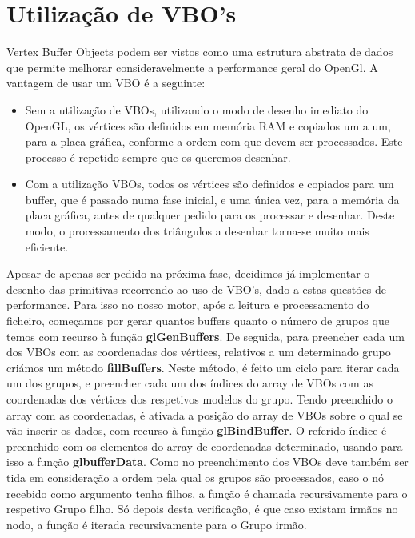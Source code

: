 \documentclass[12pt]{article}
\begin{document}
\section{Utilização de VBO's}
Vertex Buffer Objects podem ser vistos como uma estrutura abstrata de dados que permite melhorar
consideravelmente a performance geral do OpenGl.
A vantagem de usar um VBO é a seguinte:
\begin{itemize}
\item Sem a utilização de VBOs, utilizando o modo de desenho imediato do OpenGL,
os vértices são definidos em memória RAM e copiados um a um, para a placa
gráfica, conforme a ordem com que devem ser processados. Este processo é
repetido sempre que os queremos desenhar.
\item Com a utilização VBOs, todos os vértices são definidos e copiados para um buffer,
que é passado numa fase inicial, e uma única vez, para a memória da placa
gráfica, antes de qualquer pedido para os processar e desenhar.
Deste modo, o processamento dos triângulos a desenhar torna-se muito mais
eficiente.
\end{itemize} 
Apesar de apenas ser pedido na próxima fase, decidimos já implementar o desenho das primitivas recorrendo ao uso de VBO's, dado a 
estas questões de performance. Para isso no nosso motor, após a leitura e processamento do ficheiro,
começamos por gerar quantos buffers quanto o número de grupos que temos com recurso à função \textbf{glGenBuffers}.
De seguida, para preencher cada um dos VBOs com as coordenadas dos vértices, relativos a um determinado grupo criámos um método \textbf{fillBuffers}.
Neste método, é feito um ciclo para iterar cada um dos grupos, e preencher cada um dos índices do array de VBOs com as coordenadas
dos vértices dos respetivos modelos do grupo. Tendo preenchido o array com as coordenadas, é ativada a posição do array de VBOs
sobre o qual se vão inserir os dados, com recurso à função \textbf{glBindBuffer}. O referido índice
é preenchido com os elementos do array de coordenadas determinado, usando para isso
a função \textbf{glbufferData}.
Como no preenchimento dos VBOs deve também ser tida em consideração a ordem
pela qual os grupos são processados, caso o nó recebido como argumento tenha filhos,
a função é chamada recursivamente para o respetivo Grupo filho. Só depois desta
verificação, é que caso existam irmãos no nodo, a função é iterada recursivamente para
o Grupo irmão.\newline
\newpage
\end{document}
